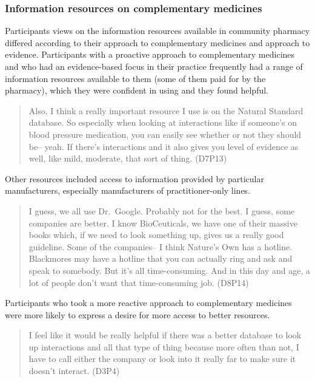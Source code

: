 \documentclass[11pt,a4paper]{article}
\begin{document}
\subsubsection{Information resources on complementary
medicines}\label{information-resources-on-complementary-medicines}

Participants views on the information resources available in community
pharmacy differed according to their approach to complementary medicines
and approach to evidence. Participants with a proactive approach to
complementary medicines and who had an evidence-based focus in their
practice frequently had a range of information resources available to
them (some of them paid for by the pharmacy), which they were confident
in using and they found helpful.

\begin{quote}
Also, I think a really important resource I use is on the Natural
Standard database. So especially when looking at interactions like if
someone's on blood pressure medication, you can easily see whether or
not they should be-- yeah. If there's interactions and it also gives you
level of evidence as well, like mild, moderate, that sort of thing.
(D7P13)
\end{quote}

Other resources included access to information provided by particular
manufacturers, especially manufacturers of practitioner-only lines.

\begin{quote}
I guess, we all use Dr.~Google. Probably not for the best. I guess, some
companies are better. I know BioCeuticals, we have one of their massive
books which, if we need to look something up, gives us a really good
guideline. Some of the companies-- I think Nature's Own has a hotline.
Blackmores may have a hotline that you can actually ring and ask and
speak to somebody. But it's all time-consuming. And in this day and age,
a lot of people don't want that time-consuming job. (D8P14)
\end{quote}

Participants who took a more reactive approach to complementary
medicines were more likely to express a desire for more access to better
resources.

\begin{quote}
I feel like it would be really helpful if there was a better database to
look up interactions and all that type of thing because more often than
not, I have to call either the company or look into it really far to
make sure it doesn't interact. (D3P4)
\end{quote}
\end{document}
